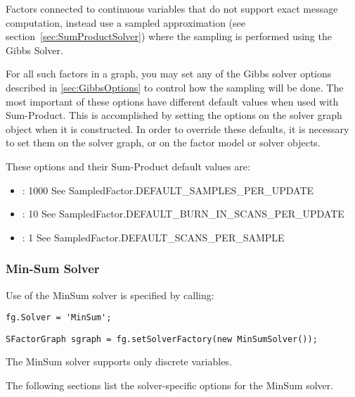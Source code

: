
Factors connected to continuous variables that do not support exact message computation, instead use a sampled approximation (see section~\ref{sec:SumProductSolver}) where the sampling is performed using the Gibbs Solver.

For all such factors in a graph, you may set any of the Gibbs solver options described in \autoref{sec:GibbsOptions} to control how the sampling will be done. The most important of these options have different default values when used with Sum-Product. This is accomplished by setting the options on the solver graph object when it is constructed. In order to override these defaults, it is necessary to set them on the solver graph, or on the factor model or solver objects.

These options and their Sum-Product default values are:

\begin{itemize}
\item {}: 1000 \ifjava See SampledFactor.DEFAULT\_SAMPLES\_PER\_UPDATE\fi
\item {}: 10 \ifjava See SampledFactor.DEFAULT\_BURN\_IN\_SCANS\_PER\_UPDATE\fi
\item {}: 1 \ifjava See SampledFactor.DEFAULT\_SCANS\_PER\_SAMPLE\fi
\end{itemize}

\clearpage
\subsubsection{Min-Sum Solver}

Use of the MinSum solver is specified by calling:

\ifmatlab
\begin{lstlisting}
fg.Solver = 'MinSum';
\end{lstlisting}
\fi

\ifjava
\begin{lstlisting}
SFactorGraph sgraph = fg.setSolverFactory(new MinSumSolver());
\end{lstlisting}
\fi

The MinSum solver supports only discrete variables.

\label{sec:MinSumOptions}

The following sections list the solver-specific options for the MinSum solver.

